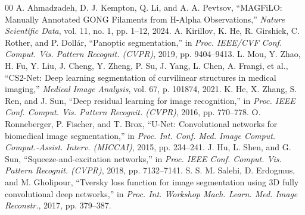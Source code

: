 \documentclass[conference]{IEEEtran}
\begin{document}
\begin{thebibliography}{00}
 A. Ahmadzadeh, D. J. Kempton, Q. Li, and A. A. Pevtsov, ``MAGFiLO: Manually Annotated GONG Filaments from H-Alpha Observations,'' \textit{Nature Scientific Data}, vol. 11, no. 1, pp. 1--12, 2024.
 A. Kirillov, K. He, R. Girshick, C. Rother, and P. Doll\'ar, ``Panoptic segmentation,'' in \textit{Proc. IEEE/CVF Conf. Comput. Vis. Pattern Recognit. (CVPR)}, 2019, pp. 9404--9413.
 L. Mou, Y. Zhao, H. Fu, Y. Liu, J. Cheng, Y. Zheng, P. Su, J. Yang, L. Chen, A. Frangi, et al., ``CS2-Net: Deep learning segmentation of curvilinear structures in medical imaging,'' \textit{Medical Image Analysis}, vol. 67, p. 101874, 2021.
 K. He, X. Zhang, S. Ren, and J. Sun, ``Deep residual learning for image recognition,'' in \textit{Proc. IEEE Conf. Comput. Vis. Pattern Recognit. (CVPR)}, 2016, pp. 770--778.
 O. Ronneberger, P. Fischer, and T. Brox, ``U-Net: Convolutional networks for biomedical image segmentation,'' in \textit{Proc. Int. Conf. Med. Image Comput. Comput.-Assist. Interv. (MICCAI)}, 2015, pp. 234--241.
 J. Hu, L. Shen, and G. Sun, ``Squeeze-and-excitation networks,'' in \textit{Proc. IEEE Conf. Comput. Vis. Pattern Recognit. (CVPR)}, 2018, pp. 7132--7141.
 S. S. M. Salehi, D. Erdogmus, and M. Gholipour, ``Tversky loss function for image segmentation using 3D fully convolutional deep networks,'' in \textit{Proc. Int. Workshop Mach. Learn. Med. Image Reconstr.}, 2017, pp. 379--387.
\end{thebibliography}
\end{document}
